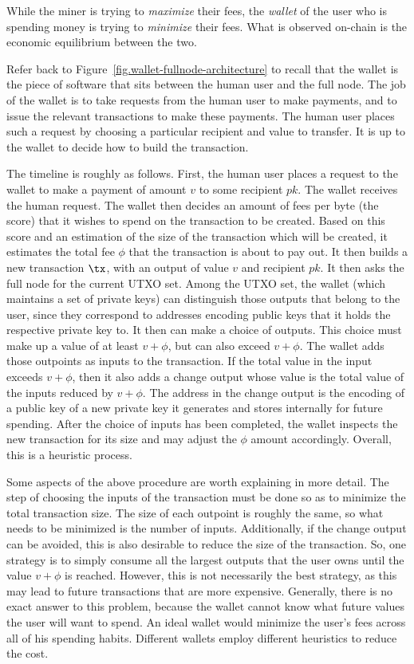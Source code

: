 While the miner is trying to \emph{maximize} their fees, the \emph{wallet} of the user
who is spending money is trying to \emph{minimize} their fees. What is observed on-chain
is the economic equilibrium between the two.

Refer back to Figure~\ref{fig.wallet-fullnode-architecture} to recall that the wallet
is the piece of software that sits between the human user and the full node. The job of
the wallet is to take requests from the human user to make payments, and to issue the relevant
transactions to make these payments. The human user places such a request by choosing a particular
recipient and value to transfer. It is up to the wallet to decide how to build the transaction.

The timeline is roughly as follows. First, the human user places a request to the wallet
to make a payment of amount $v$ to some recipient $pk$. The wallet receives the human
request. The wallet then decides an amount of fees per byte (the score) that it wishes to spend
on the transaction to be created. Based on this score and an estimation of the size of the
transaction which will be created, it estimates the total fee $\phi$ that the transaction is about
to pay out. It then builds a new transaction
$\tx$, with an output of value $v$ and recipient $pk$. It then asks the full node for
the current UTXO set. Among the UTXO set, the wallet (which maintains a set of private keys)
can distinguish those outputs that belong to the user, since they correspond to addresses
encoding public keys that it holds the respective private key to. It then can make a choice
of outputs. This choice must make up a value of at least $v + \phi$, but can also exceed $v + \phi$.
The wallet adds those outpoints as inputs to the transaction. If the total value in the input
exceeds $v + \phi$, then it also adds a change output whose value is the total value of the
inputs reduced by $v + \phi$. The address in the change output is the encoding of a public
key of a new private key it generates and stores internally for future spending. After
the choice of inputs has been completed, the wallet inspects the new transaction for
its size and may adjust the $\phi$ amount accordingly. Overall, this is a heuristic
process.

Some aspects of the above procedure are worth explaining in more detail. The step of choosing
the inputs of the transaction must be done so as to minimize the total transaction size.
The size of each outpoint is roughly the same, so what needs to be minimized is the number
of inputs. Additionally, if the change output can be avoided, this is also desirable to
reduce the size of the transaction. So, one strategy is to simply consume all the largest
outputs that the user owns until the value $v + \phi$ is reached. However, this is not
necessarily the best strategy, as this may lead to future transactions that are more expensive.
Generally, there is no exact answer to this problem, because the wallet cannot know what
future values the user will want to spend. An ideal wallet would minimize the user's fees
across all of his spending habits. Different wallets employ different heuristics to reduce
the cost.

